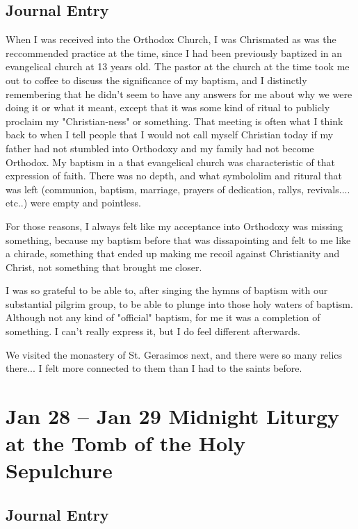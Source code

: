 \documentclass[letterpaper]{report}
\begin{document}
\subsection{Journal Entry}
When I was received into the Orthodox Church,
I was Chrismated as was the reccommended practice at the time,
since I had been previously baptized in an evangelical church at 13 years old.
The pastor at the church at the time took me out to coffee to discuss the significance of my baptism,
and I distinctly remembering that he didn't seem to have any answers for me about why we were doing it or what it meant,
except that it was some kind of ritual to publicly proclaim my "Christian-ness" or something.
That meeting is often what I think back to when I tell people that I would not call myself Christian today if my father had not stumbled into Orthodoxy and my family had not become Orthodox.
My baptism in a that evangelical church was characteristic of that expression of faith.
There was no depth, and what symbololim and ritural that was left (communion, baptism, marriage, prayers of dedication, rallys, revivals.... etc..) were empty and pointless.

For those reasons, I always felt like my acceptance into Orthodoxy was missing something,
because my baptism before that was dissapointing and felt to me like a chirade,
something that ended up making me recoil against Christianity and Christ,
not something that brought me closer.

I was so grateful to be able to,
after singing the hymns of baptism with our substantial pilgrim group,
to be able to plunge into those holy waters of baptism.
Although not any kind of "official" baptism,
for me it was a completion of something.
I can't really express it,
but I do feel different afterwards. 

We visited the monastery of St. Gerasimos next,
and there were so many relics there...
I felt more connected to them than I had to the saints before. 

\clearpage
\section{Jan 28 -- Jan 29 Midnight Liturgy at the Tomb of the Holy Sepulchure}
\subsection{Journal Entry}
\end{document}
